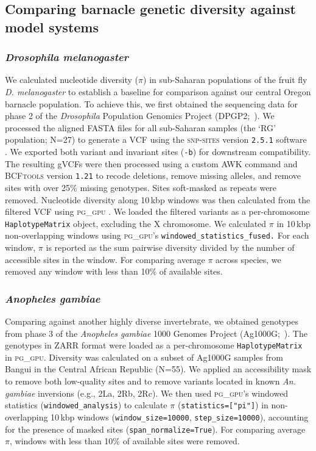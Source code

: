 \subsection*{Comparing barnacle genetic diversity against model systems}

\subsubsection*{\textit{Drosophila melanogaster}}

We calculated nucleotide diversity ($\pi$) in sub-Saharan populations of the fruit fly
\textit{D. melanogaster} to establish a baseline for comparison against our central Oregon
barnacle population.
To achieve this, we first obtained the sequencing data for phase 2 of the \textit{Drosophila}
Population Genomics Project (DPGP2;~\citealp{pool_population_2012,lack_dpgp_2016}).
We processed the aligned FASTA files for all sub-Saharan samples (the `RG' population;
N=27) to generate a VCF using the \textsc{snp-sites} version \texttt{2.5.1} software
\citep{page_snp-sites_2016}.
We exported both variant and invariant sites (\texttt{-b}) for downstream compatibility.
The resulting gVCFs were then processed using a custom AWK command and \textsc{BCFtools}
version \texttt{1.21} \citep{danecek_bcftools_2021} to recode deletions, remove missing
alleles, and remove sites with over 25\% missing genotypes.
Sites soft-masked as repeats were removed.
Nucleotide diversity along 10\,kbp windows was then calculated from the filtered VCF using
\textsc{pg\_gpu} \citep[commit \texttt{0fb9a24};][]{pope_gpu_2026}.
We loaded the filtered variants as a per-chromosome \texttt{HaplotypeMatrix} object,
excluding the X chromosome.
We calculated $\pi$ in 10\,kbp non-overlapping windows using \textsc{pg\_gpu}'s
\texttt{windowed\_statistics\_fused.}
For each window, $\pi$ is reported as the sum pairwise diversity divided by the number of
accessible sites in the window.
For comparing average $\pi$ across species, we removed any window with less than 10\%
of available sites.

\subsubsection*{\textit{Anopheles gambiae}}

Comparing against another highly diverse invertebrate, we obtained genotypes from phase 3 of
the \textit{Anopheles gambiae} 1000 Genomes Project (Ag1000G;~\citealp{ag1000g,ag1000g_ag3}).
The genotypes in ZARR format were loaded as a per-chromosome \texttt{HaplotypeMatrix} in
\textsc{pg\_gpu}.
Diversity was calculated on a subset of Ag1000G samples from Bangui in the Central African Republic (N=55).
We applied an accessibility mask to remove both low-quality sites and to remove variants
located in known \textit{An. gambiae} inversions (e.g., 2La, 2Rb, 2Rc).
We then used \textsc{pg\_gpu}'s windowed statistics (\texttt{windowed\_analysis}) to calculate
$\pi$ (\texttt{statistics=["pi"]}) in non-overlapping 10\,kbp windows (\texttt{window\_size=10000},
\texttt{step\_size=10000}), accounting for the presence of masked sites (\texttt{span\_normalize=True}).
For comparing average $\pi$, windows with less than 10\% of available sites were removed.

